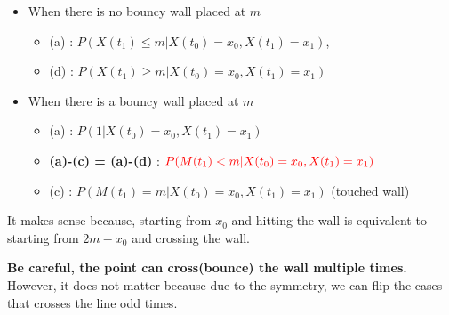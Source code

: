 \documentclass{article}
\begin{document}
\begin{itemize}
    \item When there is no bouncy wall placed at $m$
          \begin{itemize}
              \item (a) : $P(X(t_1) \le m | X(t_0) = x_0, X(t_1) = x_1)$,
              \item (d) : $P(X(t_1) \ge m | X(t_0) = x_0, X(t_1) = x_1)$
          \end{itemize}
    \item When there is a bouncy wall placed at $m$
          \begin{itemize}
              \item (a) : $P( 1 | X(t_0) = x_0, X(t_1) = x_1)$
              \item \textbf{\color{red} (a)-(c) = (a)-(d) }: $\color{red}P(M(t_1) < m | X(t_0) = x_0, X(t_1) = x_1)$
              \item (c) : $P(M(t_1) = m | X(t_0) = x_0, X(t_1) = x_1)$ (touched wall)
          \end{itemize}
\end{itemize}

It makes sense because, starting from $x_0$ and hitting the wall is equivalent to starting from $2m - x_0$ and crossing the wall.

\textbf{\color{red} Be careful, the point can cross(bounce) the wall multiple times.}
However, it does not matter because due to the symmetry, we can flip the cases that crosses the line odd times.
\end{document}
